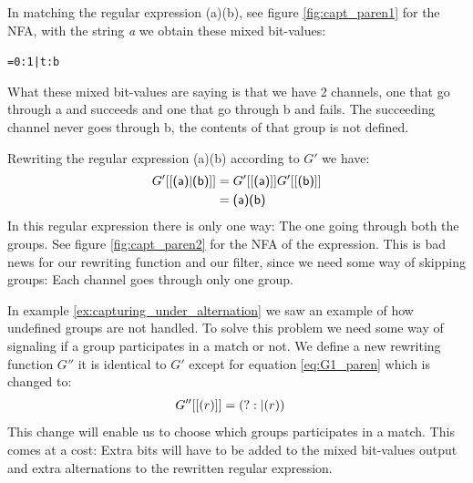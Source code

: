 \begin{example}
  \label{ex:capturing_under_alternation}
  In matching the regular expression \textsf{(a)\textbar (b)}, see
  figure \vref{fig:capt_paren1} for the NFA, with the string
  \textsl{a} we obtain these mixed bit-values: 
  \begin{center}\texttt{=0:1|t:b}\end{center}
  What these mixed bit-values are saying is that we have 2 channels,
  one that go through \textsf{a} and succeeds and one that go through
  \textsf{b} and fails. The succeeding channel never goes through
  \textsf{b}, the contents of that group is not defined.
  
  Rewriting the regular expression \textsf{(a)\textbar (b)} according
  to $G'$ we have:
  \begin{align*}
    G'[[\text{\textsf{(a)\textbar (b)}}]] &=
    G'[[\text{\textsf{(a)}}]]G'[[\text{\textsf{(b)}}]] \\
    &= \text{\textsf{(a)}}\text{\textsf{(b)}} \\
  \end{align*}
  In this regular expression there is only one way: The one going
  through both the groups. See figure \vref{fig:capt_paren2} for the
  NFA of the expression. This is bad news for our rewriting function
  and our filter, since we need some way of skipping groups: Each
  channel goes through only one group.
\end{example}

In example \ref{ex:capturing_under_alternation} we saw an example of
how undefined groups are not handled. To solve this problem we need
some way of signaling if a group participates in a match or not. We
define a new rewriting function $G''$ it is identical to $G'$ except
for equation \ref{eq:G1_paren} which is changed to:
\begin{align}
    G''[[(r)]] &= (?:|(r)) \notag
\end{align}
This change will enable us to choose which groups participates in a
match. This comes at a cost: Extra bits will have to be added to the
mixed bit-values output and extra alternations to the rewritten
regular expression. 

